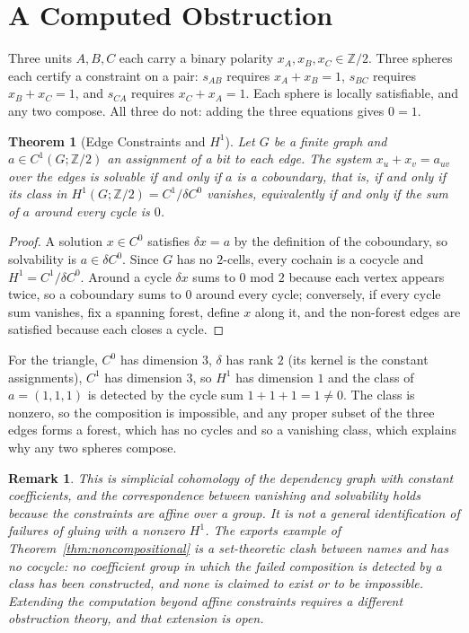 \documentclass[12pt,oneside,openany]{book}
\theoremstyle{spherepop}
\newtheorem{theorem}[definition]{Theorem}
\theoremstyle{remarkstyle}
\newtheorem{remark}[definition]{Remark}
\begin{document}
\section{A Computed Obstruction}

Three units $A,B,C$ each carry a binary polarity $x_A,x_B,x_C\in\mathbb Z/2$. Three spheres each certify a constraint on a pair: $s_{AB}$ requires $x_A+x_B=1$, $s_{BC}$ requires $x_B+x_C=1$, and $s_{CA}$ requires $x_C+x_A=1$. Each sphere is locally satisfiable, and any two compose. All three do not: adding the three equations gives $0=1$.

\begin{theorem}[Edge Constraints and $H^1$]
\label{thm:edge-h1}
Let $G$ be a finite graph and $a\in C^1(G;\mathbb Z/2)$ an assignment of a bit to each edge. The system $x_u+x_v=a_{uv}$ over the edges is solvable if and only if $a$ is a coboundary, that is, if and only if its class in $H^1(G;\mathbb Z/2)=C^1/\delta C^0$ vanishes, equivalently if and only if the sum of $a$ around every cycle is $0$.
\end{theorem}

\begin{proof}
A solution $x\in C^0$ satisfies $\delta x=a$ by the definition of the coboundary, so solvability is $a\in\delta C^0$. Since $G$ has no $2$-cells, every cochain is a cocycle and $H^1=C^1/\delta C^0$. Around a cycle $\delta x$ sums to $0$ mod $2$ because each vertex appears twice, so a coboundary sums to $0$ around every cycle; conversely, if every cycle sum vanishes, fix a spanning forest, define $x$ along it, and the non-forest edges are satisfied because each closes a cycle.
\end{proof}

For the triangle, $C^0$ has dimension $3$, $\delta$ has rank $2$ (its kernel is the constant assignments), $C^1$ has dimension $3$, so $H^1$ has dimension $1$ and the class of $a=(1,1,1)$ is detected by the cycle sum $1+1+1=1\ne0$. The class is nonzero, so the composition is impossible, and any proper subset of the three edges forms a forest, which has no cycles and so a vanishing class, which explains why any two spheres compose.

\begin{remark}
This is simplicial cohomology of the dependency graph with constant coefficients, and the correspondence between vanishing and solvability holds because the constraints are affine over a group. It is not a general identification of failures of gluing with a nonzero $H^1$. The exports example of Theorem~\ref{thm:noncompositional} is a set-theoretic clash between names and has no cocycle: no coefficient group in which the failed composition is detected by a class has been constructed, and none is claimed to exist or to be impossible. Extending the computation beyond affine constraints requires a different obstruction theory, and that extension is open.
\end{remark}
\end{document}
